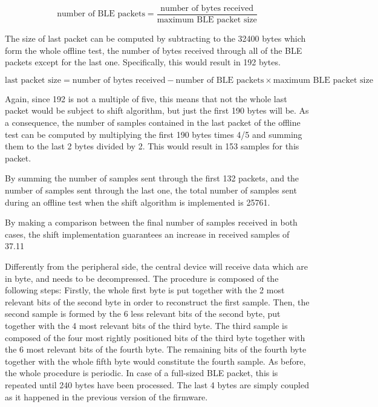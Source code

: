 \documentclass{Configuration_Files/PoliMi3i_thesis}
\begin{document}
\[
\text{number of BLE packets} = \frac{\text{number of bytes received}}{\text{maximum BLE packet size}} \tag{Equation 1}
\]

The size of last packet can be computed by subtracting to the 32400 bytes which form the whole offline test, the number of bytes received through all of the BLE packets except for the last one. Specifically, this would result in 192 bytes.

\[
\text{last packet size} = \text{number of bytes received} - \text{number of BLE packets} \times \text{maximum BLE packet size}
\]

Again, since 192 is not a multiple of five, this means that not the whole last packet would be subject to shift algorithm, but just the first 190 bytes will be. As a consequence, the number of samples contained in the last packet of the offline test can be computed by multiplying the first 190 bytes times 4/5 and summing them to the last 2 bytes divided by 2. This would result in 153 samples for this packet.

By summing the number of samples sent through the first 132 packets, and the number of samples sent through the last one, the total number of samples sent during an offline test when the shift algorithm is implemented is 25761.

By making a comparison between the final number of samples received in both cases, the shift implementation guarantees an increase in received samples of 37.11%

Differently from the peripheral side, the central device will receive data which are in byte, and needs to be decompressed. The procedure is composed of the following steps:
Firstly, the whole first byte is put together with the 2 most relevant bits of the second byte in order to reconstruct the first sample. Then, the second sample is formed by the 6 less relevant bits of the second byte, put together with the 4 most relevant bits of the third byte. The third sample is composed of the four most rightly positioned bits of the third byte together with the 6 most relevant bits of the fourth byte. The remaining bits of the fourth byte together with the whole fifth byte would constitute the fourth sample. As before, the whole procedure is periodic. In case of a full-sized BLE packet, this is repeated until 240 bytes have been processed. The last 4 bytes are simply coupled as it happened in the previous version of the firmware.
\end{document}
